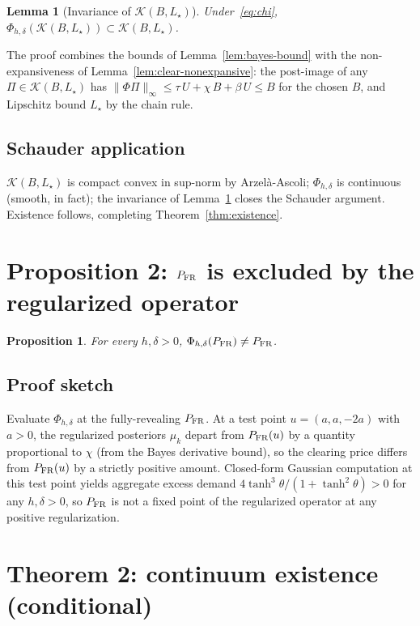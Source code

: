 \documentclass[11pt]{article}
\newtheorem{proposition}[theorem]{Proposition}
\newtheorem{lemma}[theorem]{Lemma}
\newcommand{\1}{\mathbf{1}}
\newcommand{\PFR}{P_{\rm FR}}
\begin{document}
\begin{lemma}[Invariance of $\mathcal{K}(B, L_\star)$]\label{lem:invariance}
Under~\eqref{eq:chi}, $\Phi_{h,\delta}(\mathcal{K}(B, L_\star)) \subset
\mathcal{K}(B, L_\star)$.
\end{lemma}

The proof combines the bounds of Lemma~\ref{lem:bayes-bound} with the
non-expansiveness of Lemma~\ref{lem:clear-nonexpansive}: the post-image
of any $\Pi \in \mathcal{K}(B, L_\star)$ has $\|\Phi\Pi\|_\infty \le
\tau\,U + \chi\,B + \beta\,U \le B$ for the chosen $B$, and Lipschitz
bound $L_\star$ by the chain rule.

\subsection{Schauder application}

$\mathcal{K}(B, L_\star)$ is compact convex in sup-norm by Arzel\`a-Ascoli;
$\Phi_{h,\delta}$ is continuous (smooth, in fact); the invariance of
Lemma~\ref{lem:invariance} closes the Schauder argument.  Existence
follows, completing Theorem~\ref{thm:existence}.

\section{Proposition 2: $\PFR$ is excluded by the regularized operator}

\begin{proposition}\label{prop:GS}
For every $h, \delta > 0$, $\Phi_{h,\delta}(\PFR) \ne \PFR$.
\end{proposition}

\subsection{Proof sketch}

Evaluate $\Phi_{h, \delta}$ at the fully-revealing $\PFR$.  At a test
point $u = (a, a, -2a)$ with $a > 0$, the regularized posteriors
$\mu_k$ depart from $\PFR(u)$ by a quantity proportional to $\chi$
(from the Bayes derivative bound), so the clearing price differs from
$\PFR(u)$ by a strictly positive amount.  Closed-form Gaussian
computation at this test point yields aggregate excess demand $4\tanh^3
\theta / (1 + \tanh^2 \theta) > 0$ for any $h, \delta > 0$, so $\PFR$ is
not a fixed point of the regularized operator at any positive
regularization.

\section{Theorem 2: continuum existence (conditional)}
\end{document}
